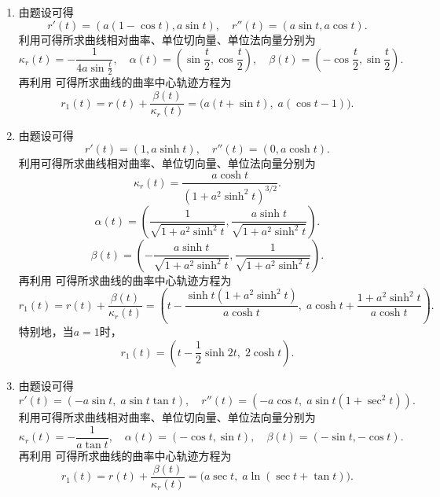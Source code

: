 \documentclass[../../main.tex]{subfiles}%
\begin{document}
\begin{solution}
\begin{enumerate}[(1)]
\item 由题设可得
\[
r'(t)=(a(1-\cos t),a\sin t),\quad r''(t)=(a\sin t,a\cos t).
\]
利用可得所求曲线相对曲率、单位切向量、单位法向量分别为
\[
\kappa_r(t)=-\frac{1}{4a\sin\frac{t}{2}},
\quad
\alpha(t)=\left(\sin\frac{t}{2},\cos\frac{t}{2}\right),
\quad
\beta(t)=\left(-\cos\frac{t}{2},\sin\frac{t}{2}\right).
\]
再利用
可得所求曲线的曲率中心轨迹方程为
\[
r_1(t)=r(t)+\frac{\beta(t)}{\kappa_r(t)}=\bigl(a(t+\sin t),\;a(\cos t-1)\bigr).
\]

\item 由题设可得
\[
r'(t)=(1,a\sinh t),\quad r''(t)=(0,a\cosh t).
\]
利用可得所求曲线相对曲率、单位切向量、单位法向量分别为
\[
\kappa_r(t)=\frac{a\cosh t}{(1+a^2\sinh^2t)^{3/2}}.
\]
\[
\alpha(t)=\left(\frac{1}{\sqrt{1+a^2\sinh^2t}},\frac{a\sinh t}{\sqrt{1+a^2\sinh^2t}}\right).
\]
\[
\beta(t)=\left(-\frac{a\sinh t}{\sqrt{1+a^2\sinh^2t}},\frac{1}{\sqrt{1+a^2\sinh^2t}}\right).
\]
再利用
可得所求曲线的曲率中心轨迹方程为
\[
r_1(t)=r(t)+\frac{\beta(t)}{\kappa_r(t)}=\left(t-\frac{\sinh t(1+a^2\sinh^2t)}{a\cosh t},\;a\cosh t+\frac{1+a^2\sinh^2t}{a\cosh t}\right).
\]
特别地，当\(a=1\)时，
\[
r_1(t)=\left(t-\frac{1}{2}\sinh2t,\;2\cosh t\right).
\]

\item 由题设可得
\[
r'(t)=(-a\sin t,\;a\sin t\tan t),\quad r''(t)=(-a\cos t,\;a\sin t(1+\sec^2t)).
\]
利用可得所求曲线相对曲率、单位切向量、单位法向量分别为
\[
\kappa_r(t)=-\frac{1}{a\tan t},
\quad
\alpha(t)=(-\cos t,\sin t),
\quad
\beta(t)=(-\sin t,-\cos t).
\]
再利用
可得所求曲线的曲率中心轨迹方程为
\[
r_1(t)=r(t)+\frac{\beta(t)}{\kappa_r(t)}=\bigl(a\sec t,\;a\ln(\sec t+\tan t)\bigr).
\]
\end{enumerate}

\end{solution}
\end{document}
